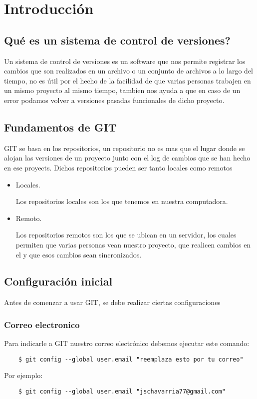 \section{Introducci\'on}
    \subsection{Qu\'e es un sistema de control de versiones?}
        Un sistema de control de versiones es un software que nos permite registrar los cambios que son realizados en un archivo o un conjunto de archivos a lo largo del tiempo, no es \'util por el hecho de la facilidad de que varias personas trabajen en un mismo proyecto al mismo tiempo, tambien nos ayuda a que en caso de un error podamos volver a versiones pasadas funcionales de dicho proyecto.

    \subsection{Fundamentos de GIT}
        GIT se basa en los repositorios, un repositorio no es mas que el lugar donde se alojan las versiones de un proyecto junto con el log de cambios que se han hecho en ese proyects.
        Dichos repositorios pueden ser tanto locales como remotos
            \begin{itemize}
                \item Locales.

                    Los repositorios locales son los que tenemos en nuestra computadora.

                \item Remoto.

                    Los repositorios remotos son los que se ubican en un servidor, los cuales permiten que varias personas vean nuestro proyecto, que realicen cambios en el y que esos cambios sean sincronizados.
            \end{itemize}

    \subsection{Configuraci\'on inicial}
            Antes de comenzar a usar GIT, se debe realizar ciertas configuraciones
            \subsubsection{Correo electronico}
                Para indicarle a GIT nuestro correo electr\'onico debemos ejecutar este comando:
                    \begin{lstlisting}
    $ git config --global user.email "reemplaza esto por tu correo"
                    \end{lstlisting}
                    Por ejemplo:
                    \begin{lstlisting}
    $ git config --global user.email "jschavarria77@gmail.com"
                    \end{lstlisting}
